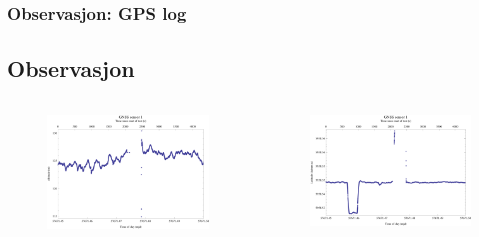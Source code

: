 \documentclass[xcolor=table]{beamer}
\begin{document}
\begin{frame}
\frametitle{Observasjon: GPS log}
  \subsection{Observasjon}
            \vspace{-40pt}
    \begin{columns}
      \begin{figure}
        \includegraphics[scale=0.40]{thesis/graphics/gnssAlt1-1.png}
      \end{figure}
                  \vspace{-30pt}
      \begin{figure}
        \includegraphics[scale=0.40]{thesis/graphics/gnssLat1-1.png}
      \end{figure}


\end{columns}
\end{frame}
\end{document}
